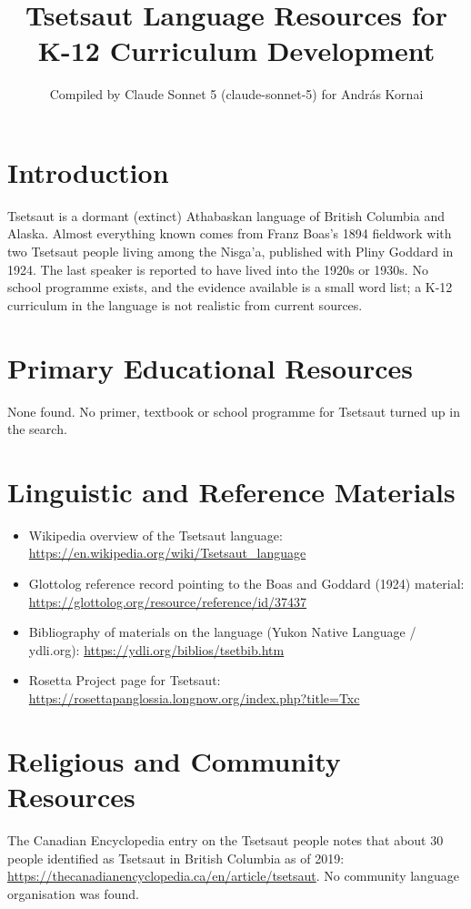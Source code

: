 \documentclass[12pt]{article}
\title{Tsetsaut Language Resources for K-12 Curriculum Development}
\author{Compiled by Claude Sonnet 5 (claude-sonnet-5) for Andr\'as Kornai}
\date{}
\begin{document}
\maketitle

\section{Introduction}
Tsetsaut is a dormant (extinct) Athabaskan language of British Columbia and Alaska. Almost everything known comes from Franz Boas's 1894 fieldwork with two Tsetsaut people living among the Nisga'a, published with Pliny Goddard in 1924. The last speaker is reported to have lived into the 1920s or 1930s. No school programme exists, and the evidence available is a small word list; a K-12 curriculum in the language is not realistic from current sources.

\section{Primary Educational Resources}
None found. No primer, textbook or school programme for Tsetsaut turned up in the search.

\section{Linguistic and Reference Materials}
\begin{itemize}
\item Wikipedia overview of the Tsetsaut language: \url{https://en.wikipedia.org/wiki/Tsetsaut_language}
\item Glottolog reference record pointing to the Boas and Goddard (1924) material: \url{https://glottolog.org/resource/reference/id/37437}
\item Bibliography of materials on the language (Yukon Native Language / ydli.org): \url{https://ydli.org/biblios/tsetbib.htm}
\item Rosetta Project page for Tsetsaut: \url{https://rosettapanglossia.longnow.org/index.php?title=Txc}
\end{itemize}

\section{Religious and Community Resources}
The Canadian Encyclopedia entry on the Tsetsaut people notes that about 30 people identified as Tsetsaut in British Columbia as of 2019: \url{https://thecanadianencyclopedia.ca/en/article/tsetsaut}. No community language organisation was found.
\end{document}
